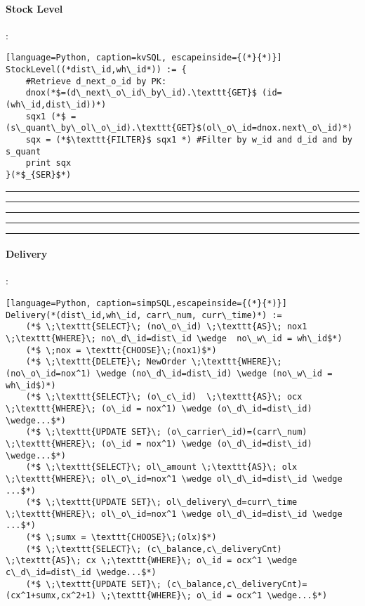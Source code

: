 \lstset{style=kvSQLstyle}
\paragraph{Stock Level}:
\begin{lstlisting}[language=Python, caption=kvSQL, escapeinside={(*}{*)}]
StockLevel((*dist\_id,wh\_id*)) := {
	#Retrieve d_next_o_id by PK:
	dnox(*$=(d\_next\_o\_id\_by\_id).\texttt{GET}$ (id=(wh\_id,dist\_id))*)
	sqx1 (*$ = (s\_quant\_by\_ol\_o\_id).\texttt{GET}$(ol\_o\_id=dnox.next\_o\_id)*)
	sqx = (*$\texttt{FILTER}$ sqx1 *) #Filter by w_id and d_id and by s_quant
	print sqx 
}(*$_{SER}$*)
\end{lstlisting}



\hrule
\hrule
\hrule
\hrule
\hrule

\vspace{10 mm}
\lstset{style=simpSQLstyle}
\paragraph{Delivery}:
\begin{lstlisting}[language=Python, caption=simpSQL,escapeinside={(*}{*)}]
Delivery(*(dist\_id,wh\_id, carr\_num, curr\_time)*) := 
	(*$ \;\texttt{SELECT}\; (no\_o\_id) \;\texttt{AS}\; nox1 \;\texttt{WHERE}\; no\_d\_id=dist\_id \wedge  no\_w\_id = wh\_id$*)
	(*$ \;nox = \texttt{CHOOSE}\;(nox1)$*)
	(*$ \;\texttt{DELETE}\; NewOrder \;\texttt{WHERE}\; (no\_o\_id=nox^1) \wedge (no\_d\_id=dist\_id) \wedge (no\_w\_id = wh\_id$)*)
	(*$ \;\texttt{SELECT}\; (o\_c\_id)  \;\texttt{AS}\; ocx \;\texttt{WHERE}\; (o\_id = nox^1) \wedge (o\_d\_id=dist\_id) \wedge...$*)
	(*$ \;\texttt{UPDATE SET}\; (o\_carrier\_id)=(carr\_num) \;\texttt{WHERE}\; (o\_id = nox^1) \wedge (o\_d\_id=dist\_id) \wedge...$*)
	(*$ \;\texttt{SELECT}\; ol\_amount \;\texttt{AS}\; olx \;\texttt{WHERE}\; ol\_o\_id=nox^1 \wedge ol\_d\_id=dist\_id \wedge ...$*)
	(*$ \;\texttt{UPDATE SET}\; ol\_delivery\_d=curr\_time \;\texttt{WHERE}\; ol\_o\_id=nox^1 \wedge ol\_d\_id=dist\_id \wedge ...$*)
	(*$ \;sumx = \texttt{CHOOSE}\;(olx)$*)
	(*$ \;\texttt{SELECT}\; (c\_balance,c\_deliveryCnt) \;\texttt{AS}\; cx \;\texttt{WHERE}\; o\_id = ocx^1 \wedge c\_d\_id=dist\_id \wedge...$*)
	(*$ \;\texttt{UPDATE SET}\; (c\_balance,c\_deliveryCnt)=(cx^1+sumx,cx^2+1) \;\texttt{WHERE}\; o\_id = ocx^1 \wedge...$*)
\end{lstlisting}


